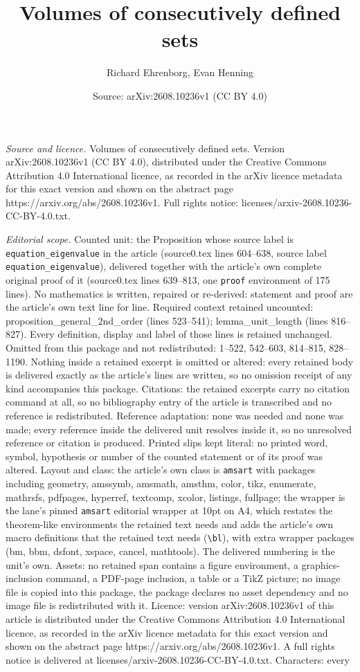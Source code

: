 \documentclass[10pt,a4paper]{amsart}
\title[Volumes of consecutively defined sets]{Volumes of consecutively defined sets}
\author{Richard Ehrenborg, Evan Henning}
\date{Source: arXiv:2608.10236v1 (CC BY 4.0)}
\begin{document}
\maketitle

\noindent\emph{Source and licence.} Volumes of consecutively defined sets. Version arXiv:2608.10236v1 (CC BY 4.0), distributed under the Creative Commons Attribution 4.0 International licence, as recorded in the arXiv licence metadata for this exact version and shown on the abstract page https://arxiv.org/abs/2608.10236v1. Full rights notice: licenses/arxiv-2608.10236-CC-BY-4.0.txt.\par\smallskip

\noindent\textit{Editorial scope.} Counted unit: the Proposition whose source label is \texttt{equation\_eigenvalue} in the article (source0.tex lines 604--638, source label \texttt{equation\_eigenvalue}), delivered together with the article's own complete original proof of it (source0.tex lines 639--813, one \texttt{proof} environment of 175 lines). No mathematics is written, repaired or re-derived: statement and proof are the article's own text line for line. Required context retained uncounted: proposition\_general\_2nd\_order (lines 523--541); lemma\_unit\_length (lines 816--827). Every definition, display and label of those lines is retained unchanged. Omitted from this package and not redistributed: 1--522, 542--603, 814--815, 828--1190. Nothing inside a retained excerpt is omitted or altered: every retained body is delivered exactly as the article's lines are written, so no omission receipt of any kind accompanies this package. Citations: the retained excerpts carry no citation command at all, so no bibliography entry of the article is transcribed and no reference is redistributed. Reference adaptation: none was needed and none was made; every reference inside the delivered unit resolves inside it, so no unresolved reference or citation is produced. Printed slips kept literal: no printed word, symbol, hypothesis or number of the counted statement or of its proof was altered. Layout and class: the article's own class is \texttt{amsart} with packages including geometry, amssymb, amsmath, amsthm, color, tikz, enumerate, mathrsfs, pdfpages, hyperref, textcomp, xcolor, listings, fullpage; the wrapper is the lane's pinned \texttt{amsart} editorial wrapper at 10pt on A4, which restates the theorem-like environments the retained text needs and adds the article's own macro definitions that the retained text needs (\texttt{\textbackslash bl}), with extra wrapper packages (bm, bbm, dsfont, xspace, cancel, mathtools). The delivered numbering is the unit's own. Assets: no retained span contains a figure environment, a graphics-inclusion command, a PDF-page inclusion, a table or a TikZ picture; no image file is copied into this package, the package declares no asset dependency and no image file is redistributed with it. Licence: version arXiv:2608.10236v1 of this article is distributed under the Creative Commons Attribution 4.0 International licence, as recorded in the arXiv licence metadata for this exact version and shown on the abstract page https://arxiv.org/abs/2608.10236v1. A full rights notice is delivered at licenses/arxiv-2608.10236-CC-BY-4.0.txt. Characters: every 
\end{document}
